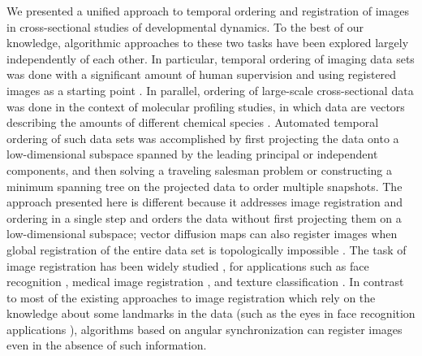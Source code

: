 \documentclass{pnastwo}
\begin{document}
\begin{article}
We presented a unified approach to temporal ordering and registration of images in cross-sectional studies of developmental dynamics. 
%
To the best of our knowledge, algorithmic approaches to these two tasks have been explored largely independently of each other. 
%
In particular, temporal ordering of imaging data sets was done with a significant amount of human supervision and using registered images as a starting point \cite{yuan2014automated, surkova2008characterization}.  
%
In parallel, ordering of large-scale cross-sectional data was done in the context of molecular profiling studies, in which data are vectors describing the amounts of different chemical species \cite{anavy2014blind, trapnell2014dynamics, gupta2008extracting}. 
%
Automated temporal ordering of such data sets was accomplished by first projecting the data onto a low-dimensional subspace spanned by the leading principal or independent components, and then solving a traveling salesman problem or constructing a minimum spanning tree on the projected data to order multiple snapshots. 
%
The approach presented here is different because it addresses image registration and ordering in a single step and orders the data without first projecting them on a low-dimensional subspace; vector diffusion maps can also register images when global registration of the entire data set is topologically impossible \cite{zhao2014rotationally}.
%
The task of image registration has been widely studied \cite{zitova2003image}, for applications such as face recognition \cite{rowley1998rotation}, medical image registration \cite{hajnal2010medical}, and texture classification \cite{greenspan1994rotation}.
%
In contrast to most of the existing approaches to image registration which rely on the knowledge about some landmarks in the data \cite{ian1998statistical} (such as the eyes in face recognition applications \cite{zhao2003face}), algorithms based on angular synchronization can register images even in the absence of such information. 


\end{article}
\end{document}
